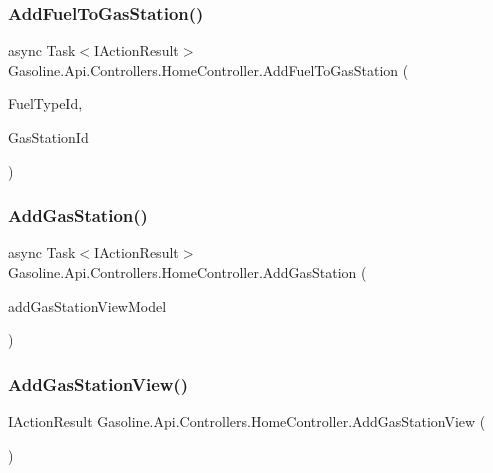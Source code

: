 \subsubsection{\texorpdfstring{AddFuelToGasStation()}{AddFuelToGasStation()}}
{\footnotesize\ttfamily async Task$<$I\+Action\+Result$>$ Gasoline.\+Api.\+Controllers.\+Home\+Controller.\+Add\+Fuel\+To\+Gas\+Station (\begin{DoxyParamCaption}\item[{Guid}]{Fuel\+Type\+Id,  }\item[{Guid}]{Gas\+Station\+Id }\end{DoxyParamCaption})}

\mbox{\label{class_gasoline_1_1_api_1_1_controllers_1_1_home_controller_a5a6fa27b91863fe033e97e5c36d4f2d9}} 
\subsubsection{\texorpdfstring{AddGasStation()}{AddGasStation()}}
{\footnotesize\ttfamily async Task$<$I\+Action\+Result$>$ Gasoline.\+Api.\+Controllers.\+Home\+Controller.\+Add\+Gas\+Station (\begin{DoxyParamCaption}\item[{\mbox{\hyperlink{class_gasoline_1_1_api_1_1_models_1_1_home_1_1_add_gas_station_view_model}{Add\+Gas\+Station\+View\+Model}}}]{add\+Gas\+Station\+View\+Model }\end{DoxyParamCaption})}

\mbox{\label{class_gasoline_1_1_api_1_1_controllers_1_1_home_controller_ae18ad72814e4c9110ef5ed4e8fa47a44}} 
\subsubsection{\texorpdfstring{AddGasStationView()}{AddGasStationView()}}
{\footnotesize\ttfamily I\+Action\+Result Gasoline.\+Api.\+Controllers.\+Home\+Controller.\+Add\+Gas\+Station\+View (\begin{DoxyParamCaption}{ }\end{DoxyParamCaption})}

